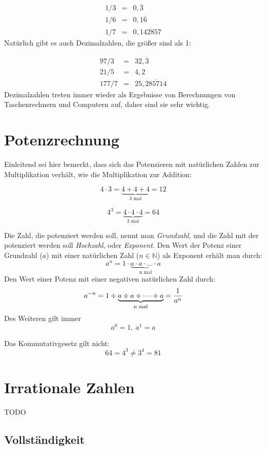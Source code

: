 \begin{eqnarray*}
1/3 &=& 0,\overline{3} \\
1/6 &=& 0,1\overline{6} \\
1/7 &=& 0,\overline{142857}
\end{eqnarray*}
Natürlich gibt es auch Dezimalzahlen, die größer sind als 1:

\begin{eqnarray*}
97/3 &=& 32,\overline{3} \\
21/5 &=& 4,2 \\
177/7 &=& 25,\overline{285714}
\end{eqnarray*}
Dezimalzahlen treten immer wieder als Ergebnisse von Berechnungen von Taschenrechnern und Computern auf, daher sind sie sehr wichtig. 


\section{Potenzrechnung}

Einleitend sei hier bemerkt, dass sich das Potenzieren mit natürlichen Zahlen zur Multiplikation verhält, wie die Multiplikation zur Addition:

\[ 4\cdot 3 = \underbrace{4+4+4}_{\text{3 mal}} = 12 \]

\[ 4^3 = \underbrace{4\cdot 4\cdot 4}_{\text{3 mal}} = 64 \]

\begin{definition}
Die Zahl, die potenziert werden soll, nennt man \textsl{Grundzahl}, und die Zahl mit der potenziert werden soll \textsl{Hochzahl}, oder \textsl{Exponent}. Den Wert der Potenz einer Grundzahl ($a$) mit einer natürlichen Zahl ($n \in \mathbb{N}$) als Exponent erhält man durch:
\[ a^n = 1\cdot \underbrace{a\cdot a \cdot \dots \cdot a}_{\text{n mal}} \]
Den Wert einer Potenz mit einer negativen natürlichen Zahl durch:
\[ a^{-n} = 1 \div \underbrace{a\div a \div \dots \div a}_{\text{n mal}} = {1 \over a^n} \]
Des Weiteren gilt immer
\[ a^0 = 1,\ a^1=a \]
\end{definition}
Das Kommutativgesetz gilt nicht:
\[ 64 = 4^3 \ne 3^4 = 81 \]



\section{Irrationale Zahlen}

TODO


\subsection{Vollständigkeit}


